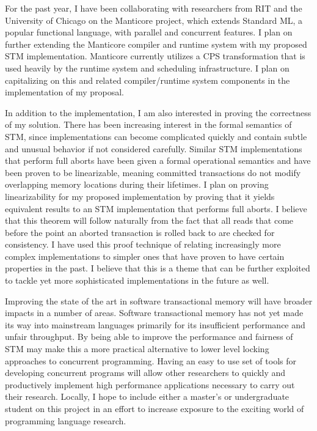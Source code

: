 \documentclass[12pt]{article}
\begin{document}
For the past year, I have been collaborating with researchers from RIT and the University of Chicago on the Manticore project, which extends Standard ML, a popular functional language, with parallel and concurrent features.  I plan on further extending the Manticore compiler and runtime system with my proposed STM implementation.  Manticore currently utilizes a CPS transformation that is used heavily by the runtime system and scheduling infrastructure.  I plan on capitalizing on this and related compiler/runtime system components in the implementation of my proposal.  

In addition to the implementation, I am also interested in proving the correctness of my solution.  There has been increasing interest in the formal semantics of STM, since implementations can become complicated quickly and contain subtle and unusual behavior if not considered carefully.  Similar STM implementations that perform full aborts have been given a formal operational semantics and have been proven to be linearizable, meaning committed transactions do not modify overlapping memory locations during their lifetimes.  I plan on proving linearizability for my proposed implementation by proving that it yields equivalent results to an STM implementation that performs full aborts.  I believe that this theorem will follow naturally from the fact that all reads that come before the point an aborted transaction is rolled back to are checked for consistency.  I have used this proof technique of relating increasingly more complex implementations to simpler ones that have proven to have certain properties in the past.  I believe that this is a theme that can be further exploited to tackle yet more sophisticated implementations in the future as well.  

Improving the state of the art in software transactional memory will have broader impacts in a number of areas.  Software transactional memory has not yet made its way into mainstream languages primarily for its insufficient performance and unfair throughput.  By being able to improve the performance and fairness of STM may make this a more practical alternative to lower level locking approaches to concurrent programming. Having an easy to use set of tools for developing concurrent programs will allow other researchers to quickly and productively implement high performance applications necessary to carry out their research.  Locally, I hope to include either a master's or undergraduate student on this project in an effort to increase exposure to the exciting world of programming language research.  
\end{document}
